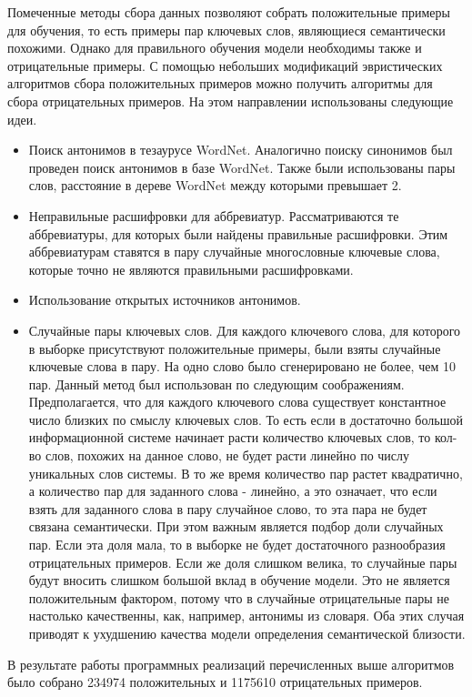Помеченные методы сбора данных позволяют собрать положительные примеры для обучения, то есть примеры пар ключевых слов, являющиеся семантически похожими. Однако для правильного обучения модели необходимы также и отрицательные примеры. С помощью небольших модификаций эвристических алгоритмов сбора положительных примеров можно получить алгоритмы для сбора отрицательных примеров. На этом направлении использованы следующие идеи.
\begin{itemize}
    \item Поиск антонимов в тезаурусе WordNet. Аналогично поиску синонимов был проведен поиск антонимов в базе WordNet. Также были использованы пары слов, расстояние в дереве WordNet между которыми превышает 2.
    \item Неправильные расшифровки для аббревиатур. Рассматриваются те аббревиатуры, для которых были найдены правильные расшифровки. Этим аббревиатурам ставятся в пару случайные многословные ключевые слова, которые точно не являются правильными расшифровками.
    \item Использование открытых источников антонимов.
    \item Случайные пары ключевых слов. Для каждого ключевого слова, для которого в выборке присутствуют положительные примеры, были взяты случайные ключевые слова в пару. На одно слово было сгенерировано не более, чем 10 пар. Данный метод был использован по следующим соображениям. Предполагается, что для каждого ключевого слова существует константное число близких по смыслу ключевых слов. То есть если в достаточно большой информационной системе начинает расти количество ключевых слов, то кол-во слов, похожих на данное слово, не будет расти линейно по числу уникальных слов системы. В то же время количество пар растет квадратично, а количество пар для заданного слова - линейно, а это означает, что если взять для заданного слова в пару случайное слово, то эта пара не будет связана семантически. При этом важным является подбор доли случайных пар. Если эта доля мала, то в выборке не будет достаточного разнообразия отрицательных примеров. Если же доля слишком велика, то случайные пары будут вносить слишком большой вклад в обучение модели. Это не является положительным фактором, потому что в случайные отрицательные пары не настолько качественны, как, например, антонимы из словаря. Оба этих случая приводят к ухудшению качества модели определения семантической близости.
\end{itemize}

В результате работы программных реализаций перечисленных выше алгоритмов было собрано 234974 положительных и 1175610 отрицательных примеров.

